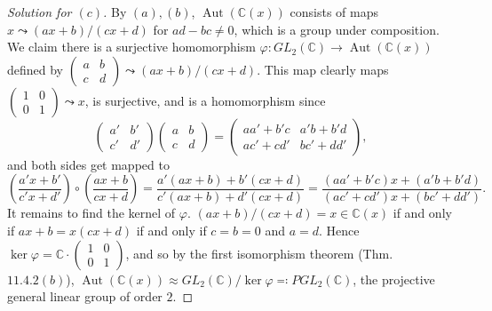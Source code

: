 \documentclass[12pt]{article}
\theoremstyle{remark}
\DeclareMathOperator{\Aut}{Aut}
\newcommand{\GL}{\mathit{GL}}
\newcommand{\PGL}{\mathit{PGL}}
\begin{document}
\begin{proof}[Solution for $(c)$]
  By $(a),(b)$, $\Aut(\mathbb{C}(x))$ consists of maps $x \leadsto (ax+b)/(cx+d)$ for $ad-bc \ne 0$, which is a group under composition. We claim there is a surjective homomorphism $\varphi\colon\GL_2(\mathbb{C}) \to \Aut(\mathbb{C}(x))$ defined by $\left(\begin{smallmatrix} a&b\\ c&d \end{smallmatrix}\right) \leadsto (ax+b)/(cx+d)$. This map clearly maps $\left(\begin{smallmatrix} 1&0\\ 0&1 \end{smallmatrix}\right) \leadsto x$, is surjective, and is a homomorphism since 
  \begin{equation*}
    \begin{pmatrix}
      a' & b'\\
      c' & d'
    \end{pmatrix}
    \begin{pmatrix}
      a & b\\
      c & d
    \end{pmatrix} = 
    \begin{pmatrix}
      aa'+b'c & a'b+b'd\\
      ac'+cd' & bc'+dd'
    \end{pmatrix},
  \end{equation*}
  and both sides get mapped to
  \begin{equation*}
    \left( \frac{a'x+b'}{c'x+d'} \right) \circ \left(\frac{ax+b}{cx+d}\right) = \frac{a'(ax+b)+b'(cx+d)}{c'(ax+b)+d'(cx+d)} = \frac{(aa'+b'c)x + (a'b+b'd)}{(ac'+cd')x+(bc'+dd')}.
  \end{equation*}
  It remains to find the kernel of $\varphi$. $(ax+b)/(cx+d) = x \in \mathbb{C}(x)$ if and only if $ax+b = x(cx+d)$ if and only if $c=b=0$ and $a=d$. Hence $\ker\varphi = \mathbb{C}\cdot\left(\begin{smallmatrix} 1&0\\ 0&1 \end{smallmatrix}\right)$, and so by the first isomorphism theorem (Thm.~$11.4.2(b)$), $\Aut(\mathbb{C}(x)) \approx \GL_2(\mathbb{C})/\ker\varphi \eqqcolon \PGL_2(\mathbb{C})$, the projective general linear group of order $2$.
\end{proof}
\end{document}
